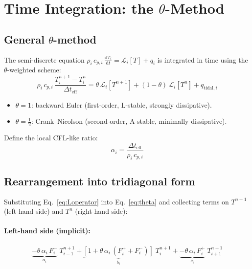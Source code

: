 \documentclass[11pt,a4paper]{article}
\newcommand{\dd}{\mathrm{d}}
\newcommand{\half}{\tfrac{1}{2}}
\begin{document}
\section{Time Integration: the $\theta$-Method}
\label{sec:time}

\subsection{General $\theta$-method}

The semi-discrete equation
$\rho_i\,c_{p,i}\,\frac{\dd T_i}{\dd t} = \mathcal{L}_i[T] + q_i$
is integrated in time using the $\theta$-weighted scheme:
\begin{equation}
\rho_i\,c_{p,i}\,\frac{T_i^{n+1} - T_i^n}{\Delta t_{\mathrm{eff}}}
  = \theta\,\mathcal{L}_i[T^{n+1}]
  + (1-\theta)\,\mathcal{L}_i[T^n]
  + q_{\mathrm{tidal},i}
\label{eq:theta}
\end{equation}

\begin{itemize}[leftmargin=2em]
\item $\theta = 1$: backward Euler (first-order, L-stable, strongly
      dissipative).
\item $\theta = \half$: Crank--Nicolson (second-order, A-stable, minimally
      dissipative).
\end{itemize}

Define the local CFL-like ratio:
\begin{equation}
\alpha_i = \frac{\Delta t_{\mathrm{eff}}}{\rho_i\,c_{p,i}}
\label{eq:alpha}
\end{equation}

\subsection{Rearrangement into tridiagonal form}

Substituting Eq.~\ref{eq:Loperator} into Eq.~\ref{eq:theta} and
collecting terms on $T^{n+1}$ (left-hand side) and $T^n$ (right-hand
side):

\paragraph{Left-hand side (implicit):}
\begin{align}
\underbrace{-\theta\,\alpha_i\,F_i^{-}}_{a_i}\;T_{i-1}^{n+1}
+ \underbrace{\left[1 + \theta\,\alpha_i\,(F_i^{+} + F_i^{-})\right]}_{b_i}\;T_i^{n+1}
+ \underbrace{-\theta\,\alpha_i\,F_i^{+}}_{c_i}\;T_{i+1}^{n+1}
\label{eq:lhs}
\end{align}
\end{document}
